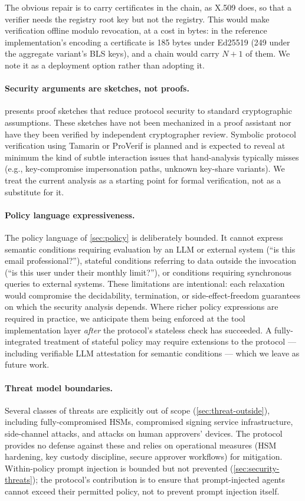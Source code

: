 \documentclass[11pt,a4paper]{article}
\begin{document}
The obvious repair is to carry certificates in the chain, as X.509 does,
so that a verifier needs the registry root key but not the registry.
This would make verification offline modulo revocation, at a cost in
bytes: in the reference implementation's encoding a certificate is 185
bytes under Ed25519 (249 under the aggregate variant's BLS keys), and a
chain would carry $N + 1$ of them. We note it as a deployment option
rather than adopting it.

\paragraph{Security arguments are sketches, not proofs.}
 presents proof sketches that reduce protocol
security to standard cryptographic assumptions. These sketches have
not been mechanized in a proof assistant nor have they been verified
by independent cryptographer review. Symbolic protocol verification
using Tamarin or ProVerif is planned and is expected to reveal at
minimum the kind of subtle interaction issues that hand-analysis
typically misses (e.g., key-compromise impersonation paths, unknown
key-share variants). We treat the current analysis as a starting
point for formal verification, not as a substitute for it.

\paragraph{Policy language expressiveness.}
The policy language of \cref{sec:policy} is deliberately bounded. It
cannot express semantic conditions requiring evaluation by an LLM or
external system (``is this email professional?''), stateful
conditions referring to data outside the invocation (``is this user
under their monthly limit?''), or conditions requiring synchronous
queries to external systems. These limitations are intentional: each
relaxation would compromise the decidability, termination, or
side-effect-freedom guarantees on which the security analysis depends.
Where richer policy expressions are required in practice, we
anticipate them being enforced at the tool implementation layer
\emph{after} the protocol's stateless check has succeeded. A
fully-integrated treatment of stateful policy may require extensions
to the protocol --- including verifiable LLM attestation for
semantic conditions --- which we leave as future work.

\paragraph{Threat model boundaries.}
Several classes of threats are explicitly out of scope
(\cref{sec:threat-outside}), including fully-compromised HSMs,
compromised signing service infrastructure, side-channel attacks,
and attacks on human approvers' devices. The protocol provides no
defense against these and relies on operational measures (HSM
hardening, key custody discipline, secure approver workflows) for
mitigation. Within-policy prompt injection is bounded but not
prevented (\cref{sec:security-threats}); the protocol's contribution
is to ensure that prompt-injected agents cannot exceed their permitted
policy, not to prevent prompt injection itself.
\end{document}
